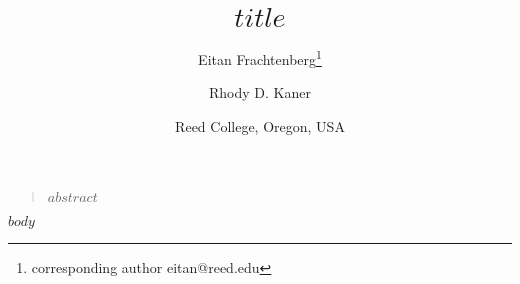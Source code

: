\documentclass[12pt]{article}
\title{$title$}
\author{Eitan Frachtenberg\thanks{corresponding author eitan@reed.edu} \and Rhody D. Kaner}
\date{Reed College, Oregon, USA}
\newenvironment{sciabstract}{%
\begin{quote} \bf}
{\end{quote}}
\begin{document}
\maketitle

\begin{sciabstract}
  $abstract$
\end{sciabstract}

$body$

\newpage{}



\end{document}
